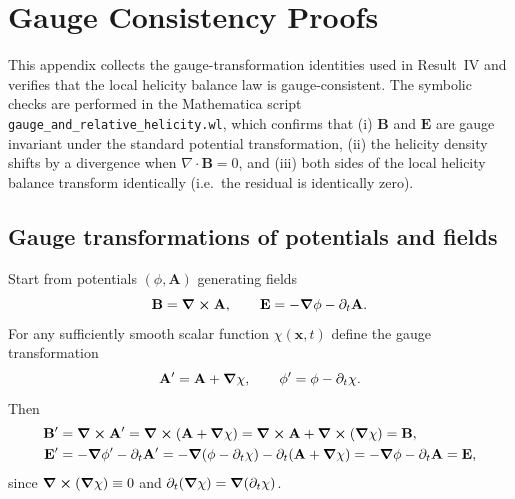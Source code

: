 \documentclass[11pt]{article}
\theoremstyle{plain}
\theoremstyle{definition}
\theoremstyle{remark}
\newcommand{\diver}{\nabla\cdot}
\newcommand{\A}{\mathbf{A}}
\newcommand{\B}{\mathbf{B}}
\newcommand{\E}{\mathbf{E}}
\begin{document}
\section{Gauge Consistency Proofs}\label{sec:app_gauge}

This appendix collects the gauge-transformation identities used in Result~IV and verifies that the
local helicity balance law is gauge-consistent. The symbolic checks are performed in the Mathematica
script \texttt{gauge\_and\_relative\_helicity.wl}, which confirms that (i) $\B$ and $\E$ are gauge
invariant under the standard potential transformation, (ii) the helicity density shifts by a
divergence when $\diver\B=0$, and (iii) both sides of the local helicity balance transform identically
(i.e.\ the residual is identically zero).

\subsection{Gauge transformations of potentials and fields}
Start from potentials $(\phi,\A)$ generating fields
\begin{equation}\label{eq:app_gauge_fields}
  \B=\curl\A,
  \qquad
  \E=-\grad\phi-\partial_t\A.
\end{equation}
For any sufficiently smooth scalar function $\chi(\mathbf{x},t)$ define the gauge transformation
\begin{equation}\label{eq:app_gauge_transform}
  \A'=\A+\grad\chi,
  \qquad
  \phi'=\phi-\partial_t\chi.
\end{equation}
Then
\begin{align}
  \B' &= \curl\A' = \curl(\A+\grad\chi)=\curl\A+\curl(\grad\chi)=\B,\\
  \E' &= -\grad\phi' - \partial_t\A'
      = -\grad(\phi-\partial_t\chi) - \partial_t(\A+\grad\chi)
      = -\grad\phi - \partial_t\A = \E,
\end{align}
since $\curl(\grad\chi)\equiv 0$ and $\partial_t(\grad\chi)=\grad(\partial_t\chi)$.
\end{document}
